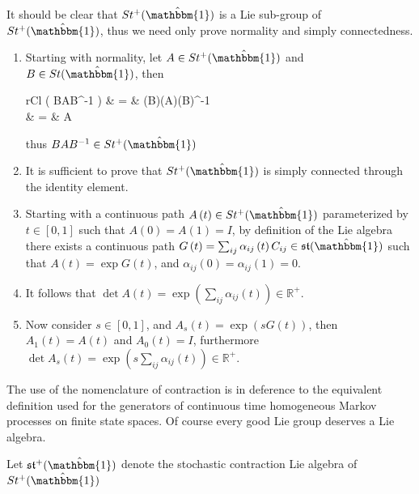 \begin{IEEEproof}
	It should be clear that $St^{+}(\hat{\mathbbm{1}})$ is a Lie sub-group of $St^{+}(\hat{\mathbbm{1}})$,
	thus we need only prove normality and simply connectedness.
	\begin{enumerate}
		\item Starting with normality, let $A \in St^{+}(\hat{\mathbbm{1}})$ and $B \in St(\hat{\mathbbm{1}})$,
		then
		\begin{IEEEeqnarray*}{rCl}
			\det \left( BAB^{-1} \right)
				& = & \left(\det B\right)\left(\det A\right)\left(\det B\right)^{-1}\\
				& = & \det A
		\end{IEEEeqnarray*}
		thus $BAB^{-1} \in St^{+}(\hat{\mathbbm{1}})$
		\item It is sufficient to prove that $St^{+}(\hat{\mathbbm{1}})$ is simply
		connected through the identity element.
		\item Starting with a continuous path $A\left(t\right) \in St^{+}(\hat{\mathbbm{1}})$
		parameterized by $t \in \left[0,1\right]$ such that $A\left(0\right) = A\left(1\right) = I$,
		by definition of the Lie algebra there exists a continuous path $G\left(t \right) = \sum_{ij} \alpha_{ij}\left(t\right) C_{ij} \in \mathfrak{st}(\hat{\mathbbm{1}})$ 
		such that $A\left(t\right) = \exp G\left(t\right)$, and $\alpha_{ij}\left(0\right) = \alpha_{ij}\left(1\right) = 0$.
		\item It follows that $\det A\left(t\right) = \exp\left(\sum_{ij} \alpha_{ij}\left(t\right)\right) \in \mathbb{R}^{+}$.
		\item Now consider $s \in \left[0,1\right]$, and $A_s\left(t\right) = \exp\left(sG\left(t\right)\right)$,
		then $A_1\left(t\right) = A\left(t\right)$ and $A_0\left(t\right) = I$,
		furthermore $\det A_s\left(t\right) = \exp\left(s \sum_{ij} \alpha_{ij}\left(t\right)\right) \in \mathbb{R}^{+}$.\hfill\IEEEQEDhere
	\end{enumerate}
\end{IEEEproof}

The use of the nomenclature of contraction is in deference to the equivalent
definition used for the generators of continuous time homogeneous Markov 
processes on finite state spaces. Of course every good Lie group deserves a Lie 
algebra.

\begin{definition}
	Let $\mathfrak{st}^{+}(\hat{\mathbbm{1}})$ denote the stochastic contraction Lie 
	algebra of $St^{+}(\hat{\mathbbm{1}})$
\end{definition}

